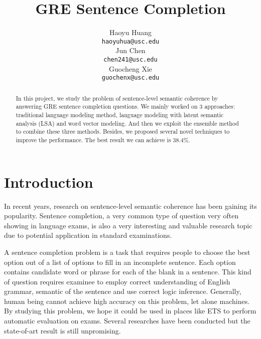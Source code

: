 \documentclass[11pt]{article}
\title{GRE Sentence Completion}
\author{Haoyu Huang \\
  {\tt haoyuhua@usc.edu} \\\And
  Jun Chen \\
  {\tt chen241@usc.edu}  \\\And
  Guocheng Xie \\
  {\tt guochenx@usc.edu} \\}
\date{}
\begin{document}
\maketitle
\begin{abstract}
In this project, we study the problem of sentence-level semantic coherence by answering GRE sentence completion questions. We mainly worked on 3 approaches: traditional language modeling method, language modeling with latent semantic analysis (LSA) and word vector modeling. And then we exploit the ensemble method to combine these three methods. Besides, we proposed several novel techniques to improve the performance. The best result we can achieve is 38.4$\%$.
  \end{abstract}
\section{Introduction}
In recent years, research on sentence-level semantic coherence has been gaining its popularity. Sentence completion, a very common type of question very often showing in language exams, is also a very interesting and valuable research topic due to potential application in standard examinations.

A sentence completion problem is a task that requires people to choose the best option out of a list of options to fill in an incomplete sentence. Each option contains candidate word or phrase for each of the blank in a sentence. This kind of question requires examinee to employ correct understanding of English grammar, semantic of the sentence and use correct logic inference. Generally, human being cannot achieve high accuracy on this problem, let alone machines. By studying this problem, we hope it could be used in places like ETS to perform automatic evaluation on exams. Several researches have been conducted but the state-of-art result is still unpromising.
\end{document}
